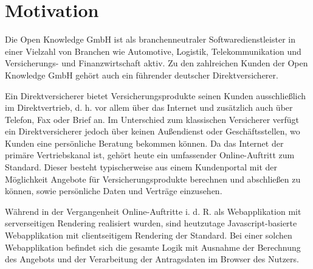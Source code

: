 \vspace{-\baselineskip}

\section{Motivation}

Die Open Knowledge GmbH ist als branchenneutraler Softwaredienstleister in einer Vielzahl von Branchen wie Automotive, Logistik, Telekommunikation und Versicherungs- und Finanzwirtschaft aktiv. Zu den zahlreichen Kunden der Open Knowledge GmbH gehört auch ein führender deutscher Direktversicherer. 

Ein Direktversicherer bietet Versicherungsprodukte seinen Kunden ausschließlich im Direktvertrieb, d. h. vor allem über das Internet und zusätzlich auch über Telefon, Fax oder Brief an. Im Unterschied zum klassischen Versicherer verfügt ein Direktversicherer jedoch über keinen Außendienst oder Geschäftsstellen, wo Kunden eine persönliche Beratung bekommen können. Da das Internet der primäre Vertriebskanal ist, gehört heute ein umfassender Online-Auftritt zum Standard. Dieser besteht typischerweise aus einem Kundenportal mit der Möglichkeit Angebote für Versicherungsprodukte berechnen und abschließen zu können, sowie persönliche Daten und Verträge einzusehen.


Während in der Vergangenheit Online-Auftritte i. d. R. als Webapplikation mit serverseitigen Rendering realisiert wurden, sind heutzutage Javascript-basierte Webapplikation mit clientseitigem Rendering der Standard. Bei einer solchen Webapplikation befindet sich die gesamte Logik mit Ausnahme der Berechnung des Angebots und der Verarbeitung der Antragsdaten im Browser des Nutzers.

